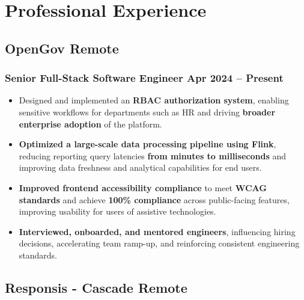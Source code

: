 \documentclass[11pt]{article} %
\begin{document}
\section{Professional Experience}
\subsection{OpenGov \hfill Remote}
\subsubsection{Senior Full-Stack Software Engineer \hfill  Apr 2024 -- Present}
\begin{itemize}
    \item {Designed and implemented an\textbf{ RBAC authorization system}, enabling sensitive workflows for departments such as HR and driving\textbf{ broader enterprise adoption}	of the platform.}
    \item {\textbf{Optimized a large-scale data processing pipeline using Flink}, reducing reporting query latencies \textbf{from minutes to milliseconds} and improving data freshness and analytical capabilities for end users.}
    \item {\textbf{Improved frontend accessibility compliance} to meet \textbf{WCAG standards} and achieve\textbf{ 100\% compliance} across public-facing features, improving usability for users of assistive technologies.}
    \item {\textbf{Interviewed, onboarded, and mentored engineers}, influencing hiring decisions, accelerating team ramp-up, and reinforcing consistent engineering standards.}
\end{itemize}

\subsection{Responsis - Cascade \hfill Remote}
\end{document}
